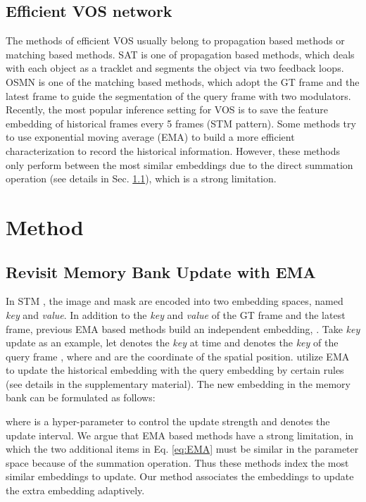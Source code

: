 \documentclass[10pt,twocolumn,letterpaper]{article}
\begin{document}
\subsection{Efficient VOS network}
\vspace{-0.3em}
The methods of efficient VOS usually belong to propagation based methods or matching based methods. SAT \cite{chen2020state} is one of propagation based methods, which deals with each object as a tracklet and segments the object via two feedback loops. OSMN \cite{yang2018efficient} is one of the matching based methods, which adopt the GT frame and the latest frame to guide the segmentation of the query frame with two modulators. Recently, the most popular inference setting for VOS is to save the feature embedding of historical frames every 5 frames (STM pattern). Some methods \cite{li2020fast, liang2020video, wang2021swiftnet} try to use exponential moving average (EMA) to build a more efficient characterization to record the historical information. However, these methods only perform between the most similar embeddings due to the direct summation operation (see details in Sec. \ref{subsec:revisit}), which is a strong limitation. 






\section{Method}
\subsection{Revisit Memory Bank Update with EMA}
\label{subsec:revisit}
In STM \cite{oh2019video}, the image and mask are encoded into two embedding spaces, named \textit{key} and \textit{value}. In addition to the \textit{key} and \textit{value} of the GT frame and the latest frame, previous EMA based methods build an independent embedding, . Take \textit{key} update as an example, let  denotes the \textit{key} at time  and  denotes the \textit{key} of the  query frame  , where  and  are the coordinate of the spatial position. \cite{li2020fast, liang2020video} utilize EMA to update the historical embedding  with the query embedding   by certain rules (see details in the supplementary material). The new embedding  in the memory bank can be formulated as follows:

where  is a hyper-parameter to control the update strength and  denotes the update interval. We argue that EMA based methods have a strong limitation, in which the two additional items in Eq. \ref{eq:EMA} must be similar in the parameter space because of the summation operation. Thus these methods \cite{li2020fast, liang2020video} index the most similar embeddings to update.  Our method associates the embeddings to update the extra embedding adaptively.
\end{document}
